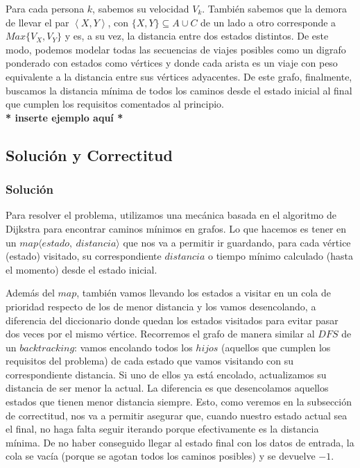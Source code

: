 		Para cada persona $k$, sabemos su velocidad $V_k$. También sabemos que la demora de llevar el par $\left \langle {X, Y} \right \rangle$, con $\{X,Y\} \subseteq A \cup C$ de un lado a otro corresponde a $Max\{ V_{X}, V_{Y}  \}$ y es, a su vez, la distancia entre dos estados distintos. De este modo, podemos modelar todas las secuencias de viajes posibles como un digrafo ponderado con estados como vértices y donde cada arista es un viaje con peso equivalente a la distancia entre sus vértices adyacentes. De este grafo, finalmente, buscamos la distancia mínima de todos los caminos desde el estado inicial al final que cumplen los requisitos comentados al principio.
		\\

		\textbf{\color{red}* inserte ejemplo aquí *}

\subsection{Solución y Correctitud}
	\subsubsection{Solución}

	Para resolver el problema, utilizamos una mecánica basada en el algoritmo de Dijkstra para encontrar caminos mínimos en grafos. Lo que hacemos es tener en un $map\langle {estado,\ distancia} \rangle$ que nos va a permitir ir guardando, para cada vértice (estado) visitado, su correspondiente $distancia$ o tiempo mínimo calculado (hasta el momento) desde el estado inicial.

		Además del $map$, también vamos llevando los estados a visitar en un cola de prioridad respecto de los de menor distancia y los vamos desencolando, a diferencia del diccionario donde quedan los estados visitados para evitar pasar dos veces por el mismo vértice.
		Recorremos el grafo de manera similar al $DFS$ de un $backtracking$: vamos encolando todos los $hijos$ (aquellos que cumplen los requisitos del problema) de cada estado que vamos visitando con su correspondiente distancia. Si uno de ellos ya está encolado, actualizamos su distancia de ser menor la actual. La diferencia es que desencolamos aquellos estados que tienen menor distancia siempre. Esto, como veremos en la subsección de correctitud, nos va a permitir asegurar que, cuando nuestro estado actual sea el final, no haga falta seguir iterando porque efectivamente es la distancia mínima.
		De no haber conseguido llegar al estado final con los datos de entrada, la cola se vacía (porque se agotan todos los caminos posibles) y se devuelve $-1$.


